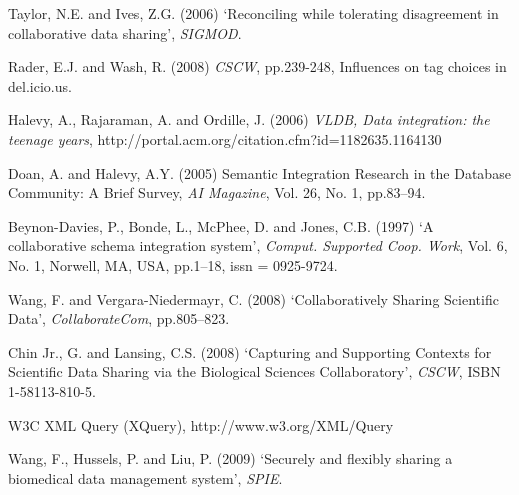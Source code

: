 \documentclass{doublecol-new}
\theoremstyle{TH}{
\newtheorem{lemma}{Lemma}
\newtheorem{theorem}[lemma]{Theorem}
\newtheorem{corrolary}[lemma]{Corrolary}
\newtheorem{conjecture}[lemma]{Conjecture}
\newtheorem{proposition}[lemma]{Proposition}
\newtheorem{claim}[lemma]{Claim}
\newtheorem{stheorem}[lemma]{Wrong Theorem}
\newtheorem{algorithm}{Algorithm}
}
\theoremstyle{THrm}{
\newtheorem{definition}{Definition}[section]
\newtheorem{question}{Question}[section]
\newtheorem{remark}{Remark}
\newtheorem{scheme}{Scheme}
}
\theoremstyle{THhit}{
\newtheorem{case}{Case}[section]
}
\begin{document}
\begin{thebibliography}{10}
Taylor, N.E. and Ives, Z.G. (2006) `Reconciling while tolerating
disagreement in collaborative data sharing', {\it SIGMOD}.

Rader, E.J. and Wash, R. (2008) {\it CSCW}, pp.239-248, Influences
on tag choices in del.icio.us.

Halevy, A., Rajaraman, A. and Ordille, J. (2006) {\it VLDB, Data
integration: the teenage years},
http://portal.acm.org/citation.cfm?id=1182635.1164130

Doan, A. and Halevy, A.Y. (2005) Semantic Integration Research in
the Database Community: A Brief Survey, {\it AI Magazine}, Vol. 26,
No. 1, pp.83--94.

Beynon-Davies, P., Bonde, L., McPhee, D. and Jones, C.B. (1997) `A
collaborative schema integration system', {\it Comput. Supported
Coop. Work}, Vol. 6, No. 1, Norwell, MA, USA, pp.1--18, issn =
0925-9724.

Wang, F. and Vergara-Niedermayr, C. (2008) `Collaboratively Sharing
Scientific Data', {\it CollaborateCom}, pp.805--823.

 Chin Jr., G. and Lansing,
C.S. (2008) `Capturing and Supporting Contexts for Scientific Data
Sharing via the Biological Sciences Collaboratory', {\it CSCW}, ISBN
1-58113-810-5.

W3C XML Query (XQuery), http://www.w3.org/XML/Query

Wang, F., Hussels, P. and Liu, P. (2009) `Securely and flexibly
sharing a biomedical data management system', {\it SPIE}.

 \end{thebibliography}
\end{document}
